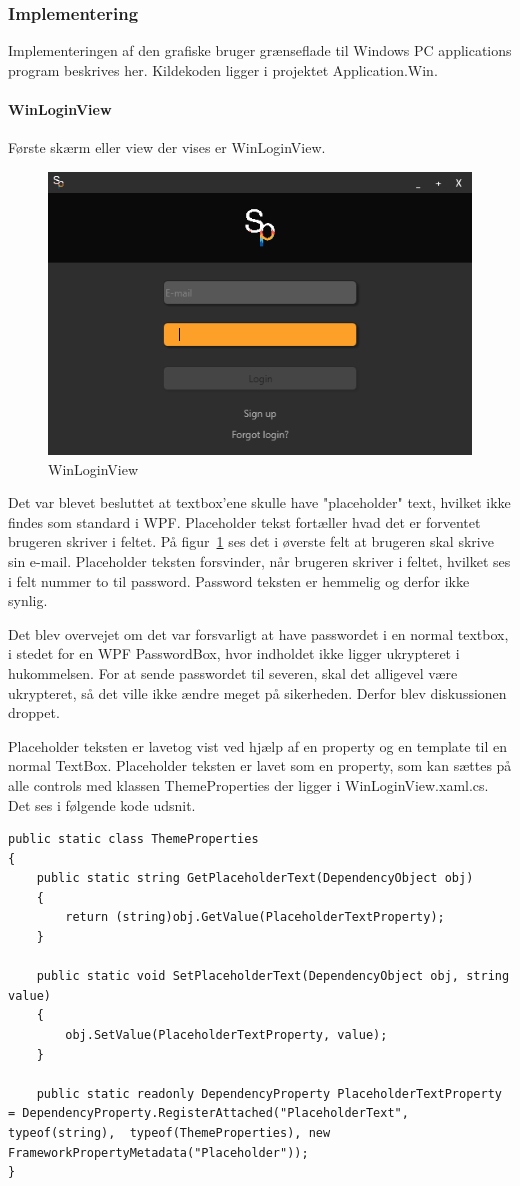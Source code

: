 \subsubsection{Implementering}
Implementeringen af den grafiske bruger grænseflade til Windows PC applications program beskrives her.
Kildekoden ligger i projektet Application.Win.

\paragraph{WinLoginView}
Første skærm eller view der vises er WinLoginView.
\begin{figure}
	\centering
	\includegraphics[width=0.7\linewidth]{figs/implementering/winloginview}
	\caption{WinLoginView}
	\label{fig:winloginview}
\end{figure}
Det var blevet besluttet at textbox'ene skulle have "placeholder" text, hvilket ikke findes som standard i WPF. Placeholder tekst fortæller hvad det er forventet brugeren skriver i feltet. På figur~\ref{fig:winloginview} ses det i øverste felt at brugeren skal skrive sin e-mail. Placeholder teksten forsvinder, når brugeren skriver i feltet, hvilket ses i felt nummer to til password. Password teksten er hemmelig og derfor ikke synlig. 

Det blev overvejet om det var forsvarligt at have passwordet i en normal textbox, i stedet for en WPF PasswordBox, hvor indholdet ikke ligger ukrypteret i hukommelsen. 
For at sende passwordet til severen, skal det alligevel være ukrypteret, så det ville ikke ændre meget på sikerheden. Derfor blev diskussionen droppet.

Placeholder teksten er lavetog vist ved hjælp af en property og en template til en normal TextBox.
Placeholder teksten er lavet som en property, som kan sættes på alle controls med klassen ThemeProperties der ligger i WinLoginView.xaml.cs. Det ses i følgende kode udsnit.
\begin{lstlisting}[caption=ThemeProperties, label=code:ThemeProperties]
public static class ThemeProperties
{
	public static string GetPlaceholderText(DependencyObject obj)
	{
		return (string)obj.GetValue(PlaceholderTextProperty);
	}
	
	public static void SetPlaceholderText(DependencyObject obj, string value)
	{
		obj.SetValue(PlaceholderTextProperty, value);
	}
	
	public static readonly DependencyProperty PlaceholderTextProperty = DependencyProperty.RegisterAttached("PlaceholderText", typeof(string),	typeof(ThemeProperties), new FrameworkPropertyMetadata("Placeholder"));
}
\end{lstlisting} 

